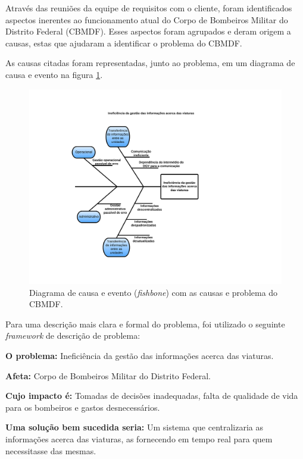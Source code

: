 Através das reuniões da equipe de requisitos com o cliente, foram identificados aspectos inerentes ao funcionamento
atual do Corpo de Bombeiros Militar do Distrito Federal (CBMDF). Esses aspectos foram agrupados e deram origem a causas, estas
que ajudaram a identificar o problema do CBMDF.

As causas citadas foram representadas, junto ao problema, em um diagrama de causa e evento na figura \ref{fishbone}.

  \begin{figure}[!htbp]
    \centering
    \includegraphics[scale=0.8, angle=0]{figuras/fishbone}
    \caption{Diagrama de causa e evento (\textit{fishbone}) com as causas e problema do CBMDF.}
    \label{fishbone}
  \end{figure}

    \vfill
  \pagebreak

Para uma descrição mais clara e formal do problema, foi utilizado o seguinte \textit{framework} de descrição de problema:

  \textbf{O problema:} Ineficiência da gestão das informações acerca das viaturas.
  
  \textbf{Afeta:} Corpo de Bombeiros Militar do Distrito Federal.
  
  \textbf{Cujo impacto é:} Tomadas de decisões inadequadas, falta de qualidade de vida para os bombeiros e 
  gastos desnecessários.
  
  \textbf{Uma solução bem sucedida seria:} Um sistema que centralizaria as informações acerca das viaturas, as fornecendo 
  em tempo real para quem necessitasse das mesmas.